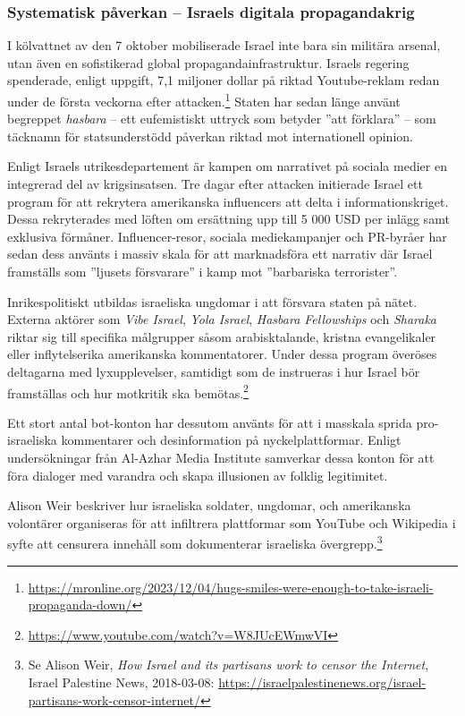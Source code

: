 \subsubsection*{Systematisk påverkan – Israels digitala propagandakrig}

I kölvattnet av den 7 oktober mobiliserade Israel inte bara sin militära arsenal, utan även en sofistikerad global propagandainfrastruktur. Israels regering spenderade, enligt uppgift, 7,1 miljoner dollar på riktad Youtube-reklam redan under de första veckorna efter attacken.\footnote{\url{https://mronline.org/2023/12/04/hugs-smiles-were-enough-to-take-israeli-propaganda-down/}} Staten har sedan länge använt begreppet \textit{hasbara} – ett eufemistiskt uttryck som betyder ”att förklara” – som täcknamn för statsunderstödd påverkan riktad mot internationell opinion.

Enligt Israels utrikesdepartement är kampen om narrativet på sociala medier en integrerad del av krigsinsatsen. Tre dagar efter attacken initierade Israel ett program för att rekrytera amerikanska influencers att delta i informationskriget. Dessa rekryterades med löften om ersättning upp till 5 000 USD per inlägg samt exklusiva förmåner. Influencer-resor, sociala mediekampanjer och PR-byråer har sedan dess använts i massiv skala för att marknadsföra ett narrativ där Israel framställs som ”ljusets försvarare” i kamp mot ”barbariska terrorister”.

Inrikespolitiskt utbildas israeliska ungdomar i att försvara staten på nätet. Externa aktörer som \textit{Vibe Israel}, \textit{Yola Israel}, \textit{Hasbara Fellowships} och \textit{Sharaka} riktar sig till specifika målgrupper såsom arabisktalande, kristna evangelikaler eller inflytelserika amerikanska kommentatorer. Under dessa program överöses deltagarna med lyxupplevelser, samtidigt som de instrueras i hur Israel bör framställas och hur motkritik ska bemötas.\footnote{\url{https://www.youtube.com/watch?v=W8JUcEWmwVI}}

Ett stort antal bot-konton har dessutom använts för att i masskala sprida pro-israeliska kommentarer och desinformation på nyckelplattformar. Enligt undersökningar från Al-Azhar Media Institute samverkar dessa konton för att föra dialoger med varandra och skapa illusionen av folklig legitimitet.

Alison Weir beskriver hur israeliska soldater, ungdomar, och amerikanska volontärer organiseras för att infiltrera plattformar som YouTube och Wikipedia i syfte att censurera innehåll som dokumenterar israeliska övergrepp.\footnote{Se Alison Weir, \textit{How Israel and its partisans work to censor the Internet}, Israel Palestine News, 2018-03-08: \url{https://israelpalestinenews.org/israel-partisans-work-censor-internet/}}


